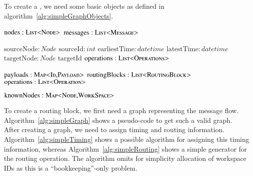 To create a , we need some basic objects as defined in algorithm~\ref{alg:simpleGraphObjects}.
\begin{breakablealgorithm}
	\label{alg:simpleGraphObjects}
	\begin{algorithmic}[1]
			\State $\text{nodes}:\textsc{List<Node>}$
			\State $\text{messages}:\textsc{List<Message>}$
		\EndObject
		\item[]
			\State $\text{sourceNode}: Node$
			\State $\text{sourceId}: int$
			\State $\text{earliestTime}: datetime$
			\State $\text{latestTime}:datetime$
			\State $\text{targetNode}: Node$
			\State $\text{targetId}$
			\State $\text{operations}: \textsc{List<Operations>}$
		\EndObject
		\item[]
			\State $\text{payloads}:\textsc{Map<Id,Payload>}$
			\State $\text{routingBlocks}:\textsc{List<RoutingBlock>}$
			\State $\text{operations}:\textsc{List<Operation>}$
			\item[]
						
		\EndObject
		\item[]
			\State $\text{knownNodes}:\textsc{Map<Node,WorkSpace>}$
			\item[]
		\EndObject
	\end{algorithmic}
\end{breakablealgorithm}

To create a routing block, we first need a graph representing the message flow. Algorithm~\ref{alg:simpleGraph} shows a pseudo-code to get such a valid graph. After creating a graph, we need to assign timing and routing information. Algorithm~\ref{alg:simpleTiming} shows a possible algorithm for assigning this timing information, whereas Algorithm~\ref{alg:simpleRouting} shows a simple generator for the routing operation. The algorithm omits for simplicity allocation of workspace IDs as this is a ``bookkeeping''-only problem.

